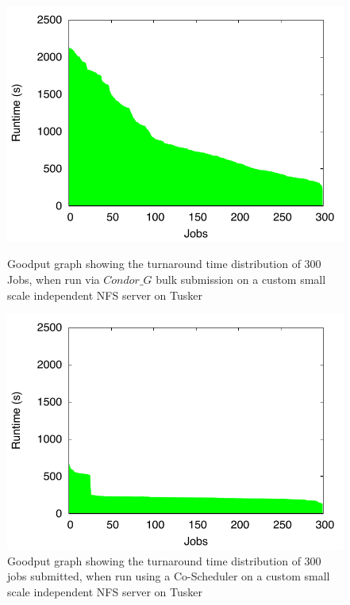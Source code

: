 \documentclass[ms,electronic,double]{nuthesis}
\begin{document}
\begin{figure}[htbp!]

\begin{center}
\includegraphics{images/nfs_tusker_goodput}
\caption{Goodput graph showing the turnaround time distribution of 300 Jobs, when run via $Condor\_G$ bulk submission on a custom small scale independent NFS server on Tusker}
\label{fig:nfs_tusker_goodput}
\end{center}


\begin{center}
\includegraphics{images/nfs_coscheduler_tusker_goodput}
\caption{Goodput graph showing the turnaround time distribution of 300 jobs submitted, when run using a Co-Scheduler on a custom small scale independent NFS server on Tusker}
\label{fig:nfs_coscheduler_tusker_goodput}
\end{center}


\end{figure}
\FloatBarrier
\end{document}
